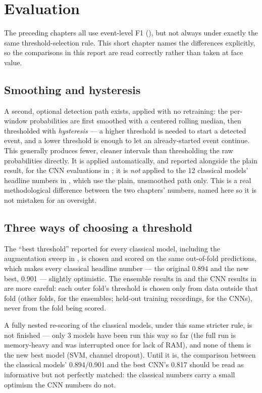 \chapter{Evaluation}
\label{chap:evaluation}

The preceding chapters all use event-level F1 (), but not always under
exactly the same threshold-selection rule. This short chapter names the differences explicitly,
so the comparisons in this report are read correctly rather than taken at face value.

\section{Smoothing and hysteresis}

A second, optional detection path exists, applied with no retraining: the per-window
probabilities are first smoothed with a centered rolling median, then thresholded with
\emph{hysteresis} --- a higher threshold is needed to start a detected event, and a lower
threshold is enough to let an already-started event continue. This generally produces fewer,
cleaner intervals than thresholding the raw probabilities directly. It is applied automatically,
and reported alongside the plain result, for the CNN evaluations in ; it
is \emph{not} applied to the 12 classical models' headline numbers in
, which use the plain, unsmoothed path only. This is a real
methodological difference between the two chapters' numbers, named here so it is not mistaken
for an oversight.

\section{Three ways of choosing a threshold}

The ``best threshold'' reported for every classical model, including the augmentation sweep in
, is chosen and scored on the same out-of-fold predictions, which makes
every classical headline number --- the original 0.894 and the new best, 0.901 --- slightly
optimistic. The ensemble results in  and the CNN results in
 are more careful: each outer fold's threshold is chosen only from data
outside that fold (other folds, for the ensembles; held-out training recordings, for the CNNs),
never from the fold being scored.

A fully nested re-scoring of the classical models, under this same stricter rule, is not
finished --- only 3 models have been run this way so far (the full run is memory-heavy and was
interrupted once for lack of RAM), and none of them is the new best model (SVM, channel
dropout). Until it is, the comparison between the classical models' 0.894/0.901 and the best
CNN's 0.817 should be read as informative but not perfectly matched: the classical numbers carry
a small optimism the CNN numbers do not.

